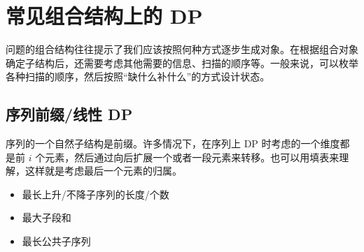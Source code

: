 \chapter{常见组合结构上的 DP}


问题的组合结构往往提示了我们应该按照何种方式逐步生成对象。在根据组合对象确定子结构后，还需要考虑其他需要的信息、扫描的顺序等。一般来说，可以枚举各种扫描的顺序，然后按照“缺什么补什么”的方式设计状态。

\section{序列前缀/线性 DP}

序列的一个自然子结构是前缀。许多情况下，在序列上 DP 时考虑的一个维度都是前 $i$ 个元素，然后通过向后扩展一个或者一段元素来转移。也可以用填表来理解，这样就是考虑最后一个元素的归属。

\begin{example}[经典问题]
    \begin{itemize}
        \item 最长上升/不降子序列的长度/个数
        \item 最大子段和
        \item 最长公共子序列
    \end{itemize}
\end{example}

\begin{exercise}[P2679]
\end{exercise}

